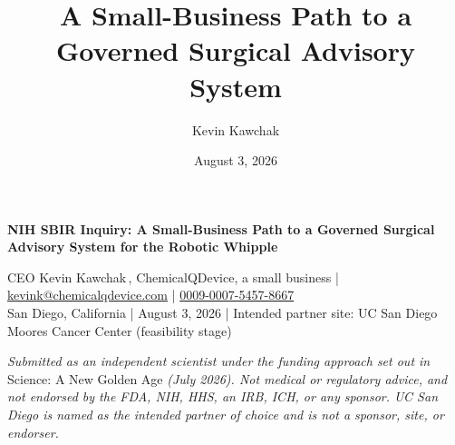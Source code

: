 \documentclass[11pt]{article}
\title{A Small-Business Path to a Governed Surgical Advisory System}
\author{Kevin Kawchak}
\date{August 3, 2026}
\begin{document}
\thispagestyle{plain}

{\raggedright\large\bfseries\color{protoblue} NIH SBIR Inquiry: A Small-Business
Path to a Governed Surgical Advisory System for the Robotic Whipple\par}

\vspace{0.15em}


\vspace{-0.2em}
\apprule{0.8pt}

\noindent\small CEO Kevin Kawchak\,,
ChemicalQDevice, a small business \;|\;
\href{mailto:kevink@chemicalqdevice.com}{kevink@chemicalqdevice.com} \;|\;
\href{https://orcid.org/0009-0007-5457-8667}{0009-0007-5457-8667}\\
San Diego, California \;|\; August 3, 2026 \;|\; Intended partner site: UC San
Diego Moores Cancer Center (feasibility stage)\normalsize\par

\vspace{0.05em}

\noindent\footnotesize\textit{Submitted as an independent scientist under the
funding approach set out in} Science: A New Golden Age \textit{(July 2026). Not
medical or regulatory advice, and not endorsed by the FDA, NIH, HHS, an IRB,
ICH, or any sponsor. UC San Diego is named as the intended partner of choice and
is not a sponsor, site, or endorser.}\normalsize\par

\vspace{-0.1em}
\apprule{0.4pt}







\end{document}
